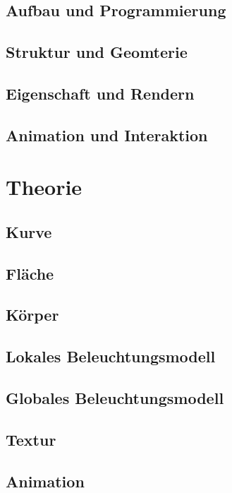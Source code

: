 \documentclass{scrreprt}
\begin{document}
\chapter{Aufbau und Programmierung}


\chapter{Struktur und Geomterie}


\chapter{Eigenschaft und Rendern}


\chapter{Animation und Interaktion}


\part{Theorie}
\chapter{Kurve}


\chapter{Fläche}


\chapter{Körper}


\chapter{Lokales Beleuchtungsmodell}


\chapter{Globales Beleuchtungsmodell}


\chapter{Textur}


\chapter{Animation}



\end{document}
